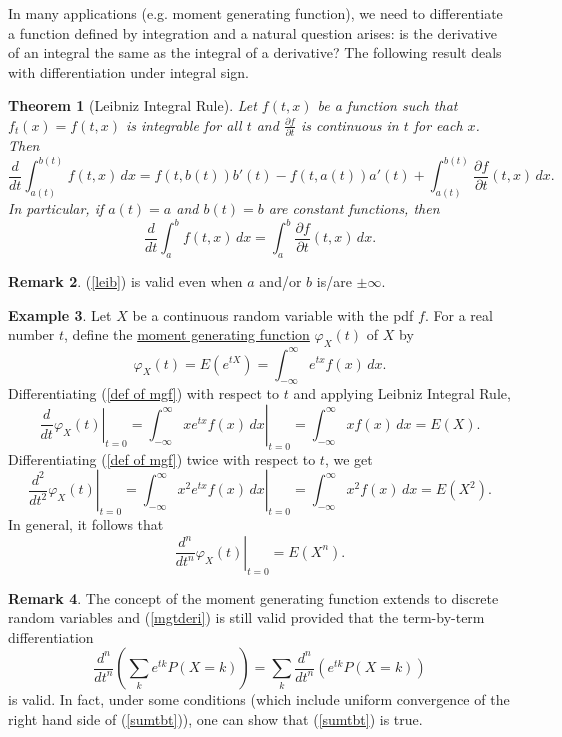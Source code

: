 \documentclass[12pt,letterpaper]{book}
\numberwithin{equation}{section}
\newtheorem{thm}{\textbf{Theorem}}[section]
\theoremstyle{definition}
\newtheorem{example}[thm]{\textbf{Example}}
\newtheorem{remark}[thm]{\textbf{Remark}}
\begin{document}
In many applications (e.g. moment generating function), we need to differentiate a function defined by integration and a natural question arises: is the derivative of an integral the same as the integral of a derivative? The following result deals with differentiation under integral sign.

\begin{thm}[Leibniz Integral Rule] Let $f(t,x)$ be a function such that $f_t(x)=f(t,x)$ is integrable for all $t$ and $\frac{\partial f}{\partial t}$ is continuous in $t$ for each $x$. Then
$$\frac{d}{dt}\int_{a(t)}^{b(t)}f(t,x)\,dx=f(t,b(t))b'(t)-f(t,a(t))a'(t)+\int_{a(t)}^{b(t)}\frac{\partial f}{\partial t}(t,x)\,dx.$$
In particular, if $a(t)=a$ and $b(t)=b$ are constant functions, then
\begin{equation}\label{leib} \frac{d}{dt}\int_{a}^{b}f(t,x)\,dx=\int_{a}^{b}\frac{\partial f}{\partial t}(t,x)\,dx.\end{equation}
\end{thm}

\begin{remark}
(\ref{leib}) is valid even when $a$ and/or $b$ is/are $\pm\infty$.
\end{remark}

\begin{example}
Let $X$ be a continuous random variable with the pdf $f$. For a real number $t$, define the \underline{moment generating function} $\varphi_X(t)$ of $X$ by
\begin{equation}\label{def of mgf}\varphi_X(t)=E(e^{tX})=\int_{-\infty}^\infty e^{tx}f(x)\,dx.\end{equation}
Differentiating (\ref{def of mgf}) with respect to $t$ and applying Leibniz Integral Rule,
$$\left.\frac{d}{dt}\varphi_X(t)\right|_{t=0}=\left.\int_{-\infty}^\infty xe^{tx}f(x)\,dx\right|_{t=0}=\int_{-\infty}^\infty xf(x)\,dx=E(X).$$
Differentiating (\ref{def of mgf}) twice with respect to $t$, we get
$$\left.\frac{d^2}{dt^2}\varphi_X(t)\right|_{t=0}=\left.\int_{-\infty}^\infty x^2e^{tx}f(x)\,dx\right|_{t=0}=\int_{-\infty}^\infty x^2f(x)\,dx=E(X^2).$$ In general, it follows that
\begin{equation}\label{mgtderi}\left.\frac{d^n}{dt^n}\varphi_X(t)\right|_{t=0}=E(X^n).\end{equation}
\end{example}

\begin{remark}
The concept of the moment generating function extends to discrete random variables and (\ref{mgtderi}) is still valid provided that the term-by-term differentiation
\begin{equation}\label{sumtbt}\frac{d^n}{dt^n}\left(\sum_k e^{tk}P(X=k)\right)=\sum_k\frac{d^n}{dt^n}\left( e^{tk}P(X=k)\right)\end{equation}
is valid. In fact, under some conditions (which include uniform convergence of the right hand side of  (\ref{sumtbt})), one can show that (\ref{sumtbt}) is true.
\end{remark}
\end{document}
